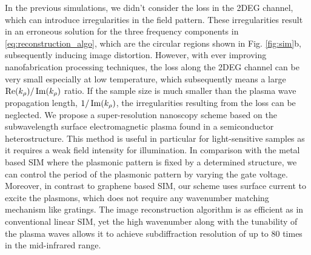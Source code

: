 In the previous simulations, we didn't consider the loss in the 2DEG channel, which can introduce irregularities in the field pattern. These irregularities result in an erroneous solution for the three frequency components in \eqref{eq:reconstruction_algo}, which are the circular regions shown in Fig. \ref{fig:sim}b, subsequently inducing image distortion. However, with ever improving nanofabrication processing techniques, the loss along the 2DEG channel can be very small especially at low temperature, which subsequently means a large $\Re(k_{\rho})/\Im(k_{\rho})$ ratio. If the sample size is much smaller than the plasma wave propagation length, $1/\Im(k_{\rho})$, the irregularities resulting from the loss can be neglected.
%
We propose a super-resolution nanoscopy scheme based on the subwavelength surface electromagnetic plasma found in a semiconductor heterostructure. This method is useful in particular for light-sensitive samples as it requires a weak field intensity for illumination. In comparison with the metal based SIM where the plasmonic pattern is fixed by a determined structure, we can control the period of the plasmonic pattern by varying the gate voltage. Moreover, in contrast to graphene based SIM, our scheme uses surface current to excite the plasmons, which does not require any wavenumber matching mechanism like gratings. The image reconstruction algorithm is as efficient as in conventional linear SIM, yet the high wavenumber along with the tunability of the plasma waves allows it to achieve subdiffraction resolution of up to 80 times in the mid-infrared range.
